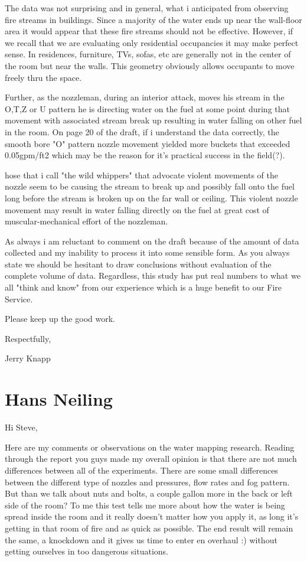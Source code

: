 \documentclass[12pt,oneside]{book}
\begin{document}
\begin{appendix}
The data was not surprising and in general, what i anticipated from observing fire streams in buildings. Since a majority of the water ends up near the wall-floor area it would appear that these fire streams should not be effective.  However, if we recall that we are evaluating only residential occupancies it may make perfect sense.  In residences, furniture, TVs, sofas, etc are generally not in the center of the room but near the walls.  This geometry obviously allows occupants to move freely thru the space.  
 
Further, as the nozzleman, during an interior attack, moves his stream in the O,T,Z or U pattern he is directing water on the fuel at some point during that movement with associated stream break up resulting in water falling on other fuel in the room.  On page 20 of the draft, if i understand the data correctly, the smooth bore "O" pattern nozzle movement yielded more buckets that exceeded 0.05gpm/ft2 which may be the reason for it's practical success in the field(?).
 
 hose that i call "the wild whippers" that advocate violent movements of the nozzle seem to be causing the stream to break up and possibly fall onto the fuel long before the stream is broken up on the far wall or ceiling.  This violent nozzle movement may result in water falling directly on the fuel at great cost of muscular-mechanical effort of the nozzleman.
 
As always i am reluctant to comment on the draft because of the amount of data collected and my inability to process it into some sensible form.  As you always state we should be hesitant to draw conclusions without evaluation of the complete volume of data.  Regardless, this study has put real numbers to what we all "think and know" from our experience which is a huge benefit to our Fire Service.
 
Please keep up the good work.
 
Respectfully,
 
Jerry Knapp

\section{Hans Neiling}

Hi Steve,
 
Here are my comments or observations on the water mapping research. Reading through the report you guys made my overall opinion is that there are not much differences between all of the experiments. There are some small differences between the different type of nozzles and pressures, flow rates and fog pattern. But than we talk about nuts and bolts, a couple gallon more in the back or left side of the room? To me this test tells me more about how the water is being spread inside the room and it really doesn't matter how you apply it, as long it's getting in that room of fire and as quick as possible. The end result will remain the same, a knockdown and it gives us time to enter en overhaul :) without getting ourselves in too dangerous situations.
 

\end{appendix}
\end{document}
